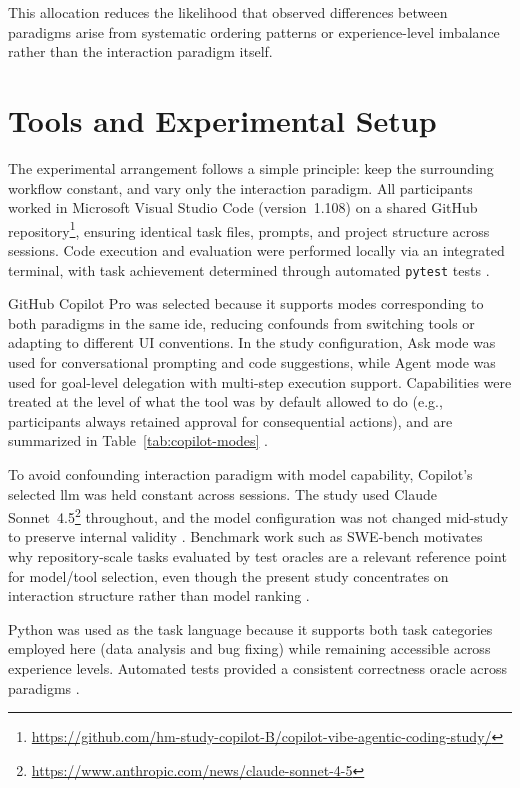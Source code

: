 This allocation reduces the likelihood that observed differences between paradigms arise from systematic ordering patterns or experience-level imbalance rather than the interaction paradigm itself.
\section{Tools and Experimental Setup}
\label{sec:tools-setup}

The experimental arrangement follows a simple principle: keep the surrounding workflow constant, and vary only the interaction paradigm. All participants worked in Microsoft Visual Studio Code (version~1.108) on a shared GitHub repository\footnote{\url{https://github.com/hm-study-copilot-B/copilot-vibe-agentic-coding-study/}}, ensuring identical task files, prompts, and project structure across sessions. Code execution and evaluation were performed locally via an integrated terminal, with task achievement determined through automated \texttt{pytest} tests \parencite{pytestDocs}.

GitHub Copilot Pro was selected because it supports modes corresponding to both paradigms in the same \gls{ide}, reducing confounds from switching tools or adapting to different UI conventions. In the study configuration, Ask mode was used for conversational prompting and code suggestions, while Agent mode was used for goal-level delegation with multi-step execution support. Capabilities were treated at the level of what the tool was by default allowed to do (e.g., participants always retained approval for consequential actions), and are summarized in Table~\ref{tab:copilot-modes} \parencite{githubCopilotFeatures,vscodeCopilotAgentMode,vscodeCopilotCodingAgent,githubAgentMode101}.

To avoid confounding interaction paradigm with model capability, Copilot’s selected \gls{llm} was held constant across sessions. The study used Claude Sonnet~4.5\footnote{\url{https://www.anthropic.com/news/claude-sonnet-4-5}} throughout, and the model configuration was not changed mid-study to preserve internal validity \parencite{githubCopilotDocs,anthropicSonnet45}. Benchmark work such as SWE-bench motivates why repository-scale tasks evaluated by test oracles are a relevant reference point for model/tool selection, even though the present study concentrates on interaction structure rather than model ranking \parencite{sweBenchmark, sweBench}.

Python was used as the task language because it supports both task categories employed here (data analysis and bug fixing) while remaining accessible across experience levels. Automated tests provided a consistent correctness oracle across paradigms \parencite{pytestDocs}.

